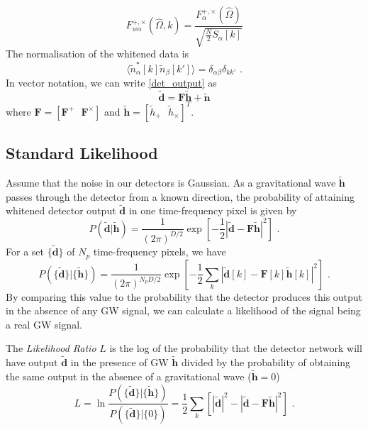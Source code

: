 \documentclass[12pt,twoside,a4paper]{report}
\newcommand{\fs}{\text{ .}}
\newcommand{\tbd}{\tilde{\textbf{d}}}
\newcommand{\tbh}{\tilde{\textbf{h}}}
\begin{document}
\begin{equation}
F^{+,\times}_{w\alpha}(\hat{\Omega},k)=\frac{F^{+,\times}_\alpha (\hat{\Omega})}{\sqrt{\frac{N}{2}S_\alpha [k]}}
\end{equation}
The normalisation of the whitened data is 
\begin{equation}
\langle  \tilde{n}^*_\alpha [k] \tilde{n}_\beta [k']  \rangle = \delta _{\alpha \beta} \delta _{k k'}  \fs
\end{equation}
In vector notation, we can write \ref{det_output} as
\begin{equation}
\tilde{\textbf{d}}=\textbf{F}\tilde{\textbf{h}}+\tilde{\textbf{n}} 
\end{equation}
where $\textbf{F}=[\textbf{F}^+ \:\:\:\textbf{F}^\times]$ and $\tilde{\textbf{h}}=[\tilde{h}_+ \:\:\: \tilde{h}_\times]^T$.

\subsection{Standard Likelihood}
Assume that the noise in our detectors is Gaussian. As a gravitational wave $\tilde{\textbf{h}}$ passes through the detector from a known direction, the probability of attaining whitened detector output $\tilde{\textbf{d}}$ in one time-frequency pixel is given by
\begin{equation}
P(\tilde{\textbf{d}}|\tilde{\textbf{h}})=\frac{1}{(2\pi )^{D/2}}\exp \left[ -\frac{1}{2} \left| \tbd - \textbf{F} \tbh  \right|^2 \right] \fs
\end{equation}  
For a set $\{ \tbd \}$ of $N_p$ time-frequency pixels, we have
\begin{equation}
P(\{ \tilde{\textbf{d}} \}|\{ \tilde{\textbf{h}} \})=\frac{1}{(2\pi )^{N_p D/2}}\exp \left[- \frac{1}{2} \sum_k \left| \tbd [k] - \textbf{F}[k] \tbh [k]  \right|^2 \right] \fs
\end{equation}  
By comparing this value to the probability that the detector produces this output in the absence of any GW signal, we can calculate a likelihood of the signal being a real GW signal. 

The \emph{Likelihood Ratio} $L$ is the log of the probability that the detector network will have output $ \tilde{\textbf{d}}$ in the presence of GW $\tbh$  divided by the probability of obtaining the same output in the absence of a gravitational wave ($\tbh=0$)
\begin{equation}
L=\ln \frac{P(\{ \tilde{\textbf{d}} \}|\{ \tilde{\textbf{h}} \})}{P(\{ \tilde{\textbf{d}} \}|\{ 0  \})}= \frac{1}{2} \sum_k \left[ \left| \tbd  \right|^2 - \left| \tbd - \textbf{F} \tbh   \right|^2  \right] \fs
\end{equation}
\end{document}
